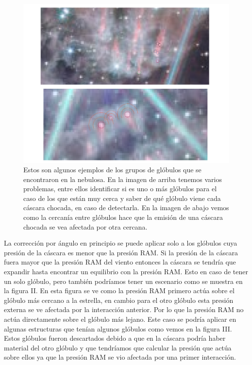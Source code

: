 \documentclass{book}
\begin{document}
\begin{figure}[h!]
    \centering
    \includegraphics[width=\textwidth]{discusion/groups_globules.pdf}
    \caption{Estos son algunos ejemplos de los grupos de glóbulos que se encontraron en la nebulosa. En la imagen de arriba tenemos varios problemas, entre ellos identificar si es uno o más glóbulos para el caso de los que están muy cerca y saber de qué glóbulo viene cada cáscara chocada, en caso de detectarla. En la imagen de abajo vemos como la cercanía entre glóbulos hace que la emisión de una cáscara chocada se vea afectada por otra cercana.}
    \label{globule_group}
\end{figure}


La corrección por ángulo en principio se puede aplicar solo a los glóbulos cuya presión de la cáscara  es menor que la presión RAM. Si la presión de la cáscara fuera mayor que la presión RAM del viento entonces la cáscara se tendría que expandir hasta encontrar un equilibrio con la presión RAM. Esto en caso de tener un solo glóbulo, pero también podríamos tener un escenario como se muestra en la figura II. En esta figura se ve como la presión RAM primero actúa sobre el glóbulo más cercano a la estrella, en cambio para el otro glóbulo esta presión externa se ve afectada por la interacción anterior. Por lo que la presión RAM no actúa directamente sobre el glóbulo más lejano. Este caso se podría aplicar en algunas estructuras que tenían algunos glóbulos como vemos en la figura III. Estos glóbulos fueron descartados debido a que en la cáscara podría haber material del otro glóbulo y que tendríamos que calcular la presión que actúa sobre ellos ya que la presión RAM se vio afectada por una primer interacción.\\
\end{document}
